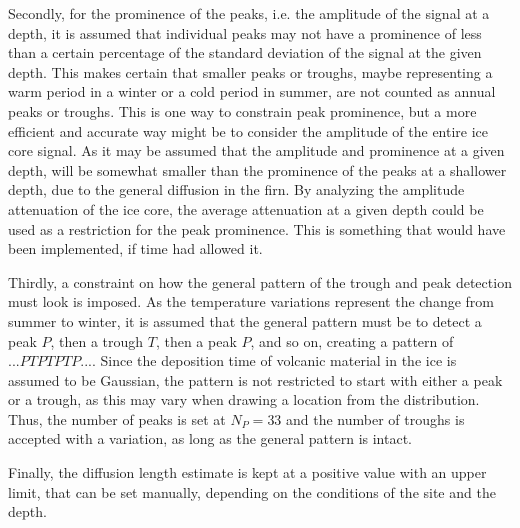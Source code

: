 \documentclass[../../CompleteThesis2/Complete_2ndDraft]{subfiles}
\begin{document}
Secondly, for the prominence of the peaks, i.e. the amplitude of the signal at a depth, it is assumed that individual peaks may not have a prominence of less than a certain percentage of the standard deviation of the signal at the given depth. This makes certain that smaller peaks or troughs, maybe representing a warm period in a winter or a cold period in summer, are not counted as annual peaks or troughs. 
This is one way to constrain peak prominence, but a more efficient and accurate way might be to consider the amplitude of the entire ice core signal. As it may be assumed that the amplitude and prominence at a given depth, will be somewhat smaller than the prominence of the peaks at a shallower depth, due to the general diffusion in the firn. By analyzing the amplitude attenuation of the ice core, the average attenuation at a given depth could be used as a restriction for the peak prominence. This is something that would have been implemented, if time had allowed it.


Thirdly, a constraint on how the general pattern of the trough and peak detection must look is imposed. As the temperature variations represent the change from summer to winter, it is assumed that the general pattern must be to detect a peak $P$, then a trough $T$, then a peak $P$, and so on, creating a pattern of $...PTPTPTP...$. Since the deposition time of volcanic material in the ice is assumed to be Gaussian, the pattern is not restricted to start with either a peak or a trough, as this may vary when drawing a location from the distribution. Thus, the number of peaks is set at $N_P=33$ and the number of troughs is accepted with a variation, as long as the general pattern is intact.

Finally, the diffusion length estimate is kept at a positive value with an upper limit, that can be set manually, depending on the conditions of the site and the depth. 
\end{document}
